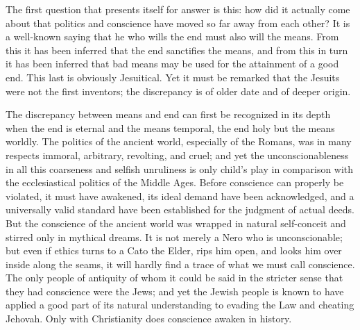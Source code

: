 \documentclass[12pt,a4paper,openany]{book}
\newcommand{\opage}[1]{\marginnote{\footnotesize\textit{[#1]}}}
\begin{document}
The first question that presents itself for answer
is this: how did it actually come about that politics
and conscience have moved so far away from each other?
It is a well-known saying that he who wills the end must also
will the means. From this it has been inferred that the end
sanctifies the means, and from this in turn it has been inferred that bad means
may be used for the attainment of a good end. This
last is obviously Jesuitical. Yet it must be remarked
that the Jesuits were not the first inventors; the discrepancy is
of older date and of deeper origin.

\setcounter{footnote}{0}%
\opage{91}The discrepancy between means and end can first be
recognized in its depth when the end is eternal and the means
temporal, the end holy but the means worldly.
The politics of the ancient world, especially of the Romans, was in
many respects immoral, arbitrary, revolting, and
cruel; and yet the unconscionableness in all this
coarseness and selfish unruliness is only child's play in
comparison with the ecclesiastical politics of the Middle Ages.
Before conscience can properly be violated, it must
have awakened, its ideal demand have been acknowledged, and a
universally valid standard have been established for the judgment of
actual deeds. But the conscience of the ancient world
was wrapped in natural self-conceit and
stirred only in mythical dreams. It is not merely
a Nero who is unconscionable; but even if ethics
turns to a Cato the Elder, rips him open, and
looks him over inside along the seams, it will hardly
find a trace of what we must call conscience. The
only people of antiquity of whom it could be said in the stricter sense
that they had conscience were the Jews; and yet the Jewish people is
known to have applied a good part of its
natural understanding to evading the Law and cheating
Jehovah. Only with Christianity does conscience awaken
in history.
\end{document}
